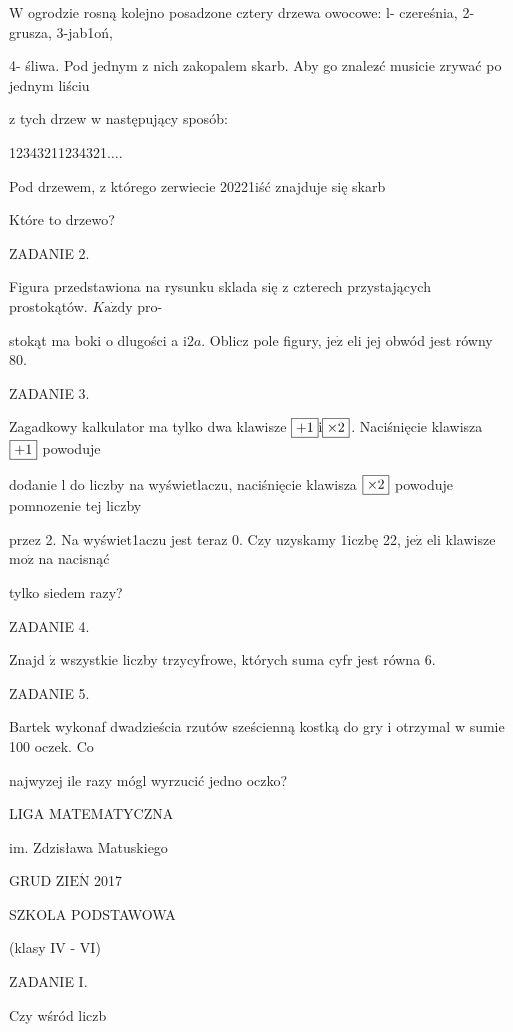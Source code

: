 \documentclass[a4paper,12pt]{article}
\begin{document}
$\mathrm{W}$ ogrodzie rosną kolejno posadzone cztery drzewa owocowe: l- czereśnia, 2- grusza, 3-jab1oń,

4- śliwa. Pod jednym z nich zakopalem skarb. Aby go znalez$\acute{}$ć musicie zrywać po jednym liściu

z tych drzew w następujący sposób:

12343211234321$\ldots.$

Pod drzewem, z którego zerwiecie 20221iść znajduje się skarb

Które to drzewo?

ZADANIE 2.

Figura przedstawiona na rysunku sklada się z czterech przystających prostokątów. $K\mathrm{a}\dot{\mathrm{z}}\mathrm{d}\mathrm{y}$ pro-

stokąt ma boki o dlugości a $\mathrm{i}2a$. Oblicz pole figury, $\mathrm{j}\mathrm{e}\dot{\mathrm{z}}$ eli jej obwód jest równy 80.

ZADANIE 3.

Zagadkowy kalkulator ma tylko dwa klawisze $\fbox{$+1$} \mathrm{i} \fbox{$\times 2$}$. Naciśnięcie klawisza $\fbox{$+1$}$ powoduje

dodanie l do liczby na wyświetlaczu, naciśnięcie klawisza $\fbox{$\times 2$}$ powoduje pomnozenie tej liczby

przez 2. Na wyświet1aczu jest teraz 0. Czy uzyskamy 1iczbę 22, $\mathrm{j}\mathrm{e}\dot{\mathrm{z}}$ eli klawisze $\mathrm{m}\mathrm{o}\dot{\mathrm{z}}$ na nacisnąć

tylko siedem razy?

ZADANIE 4.

Znajd $\acute{\mathrm{z}}$ wszystkie liczby trzycyfrowe, których suma cyfr jest równa 6.

ZADANIE 5.

Bartek wykonaf dwadzieścia rzutów sześcienną kostką do gry i otrzymal w sumie 100 oczek. Co

najwyzej ile razy mógl wyrzucić jedno oczko?






LIGA MATEMATYCZNA

im. Zdzisława Matuskiego

GRUD Z$\mathrm{I}\mathrm{E}\acute{\mathrm{N}}$ 2017

SZKOLA PODSTAWOWA

(klasy IV - VI)

ZADANIE I.

Czy wśród liczb
\end{document}
